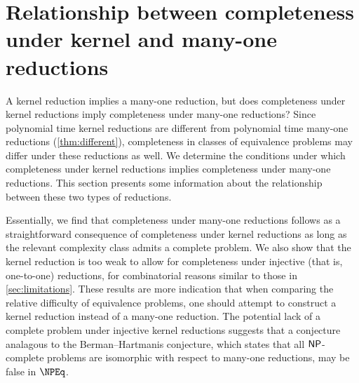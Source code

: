 \section
    [Relationship between completeness under kernel and many-one reductions]
    {Relationship between completeness \\ under kernel and many-one reductions}
\label{sec:npeqcompleteness}
%
A kernel reduction implies a many-one reduction, but does completeness under kernel reductions imply completeness under many-one reductions?
Since polynomial time kernel reductions are different from polynomial time many-one reductions (\autoref{thm:different}), completeness in classes of equivalence problems may differ under these reductions as well.
We determine the conditions under which completeness under kernel reductions implies completeness under many-one reductions.
This section presents some information about the relationship between these two types of reductions.

%
Essentially, we find that completeness under many-one reductions follows as a straightforward consequence of completeness under kernel reductions as long as the relevant complexity class admits a complete problem.
We also show that the kernel reduction is too weak to allow for completeness under injective (that is, one-to-one) reductions, for combinatorial reasons similar to those in \autoref{sec:limitations}.
These results are more indication that when comparing the relative difficulty of equivalence problems, one should attempt to construct a kernel reduction instead of a many-one reduction.
The potential lack of a complete problem under injective kernel reductions suggests that a conjecture analagous to the Berman--Hartmanis conjecture, which states that all ${\mathsf{NP}}$-complete problems are isomorphic with respect to many-one reductions, may be false in $\NPEq$.

